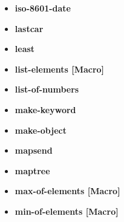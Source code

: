 \documentclass [11pt]{book}
\begin{document}
\begin{itemize}
\item {}
\label{prim:iso-8601-date}
\textbf{iso-8601-date}





\item {}
\label{prim:lastcar}
\textbf{lastcar}





\item {}
\label{prim:least}
\textbf{least}





\item {}
\label{prim:list-elements}
\textbf{list-elements [Macro]}





\item {}
\label{prim:list-of-numbers}
\textbf{list-of-numbers}





\item {}
\label{prim:make-keyword}
\textbf{make-keyword}





\item {}
\label{prim:make-object}
\textbf{make-object}





\item {}
\label{prim:mapsend}
\textbf{mapsend}





\item {}
\label{prim:maptree}
\textbf{maptree}





\item {}
\label{prim:max-of-elements}
\textbf{max-of-elements [Macro]}





\item {}
\label{prim:min-of-elements}
\textbf{min-of-elements [Macro]}






\end{itemize}
\end{document}

